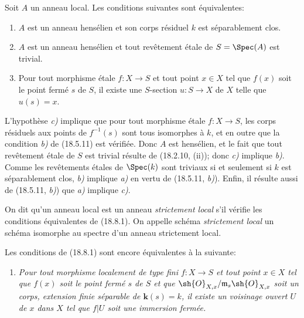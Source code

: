 \begin{proposition}[18.8.1]
\label{IV.18.8.1}
Soit $A$ un anneau local. Les conditions suivantes sont équivalentes:
\begin{enumerate}
  \item[\textup{a)}] $A$ est un anneau hensélien et son corps résiduel $k$ est séparablement clos.
  \item[\textup{b)}] $A$ est un anneau hensélien et tout revêtement étale de $S=\Spec(A)$ est trivial.
  \item[\textup{c)}] Pour tout morphisme étale $f:X\to S$ et tout point $x\in X$ tel que $f(x)$ soit le point fermé $s$ de $S$, il existe une $S$-section $u:S\to X$ de $X$ telle que $u(s)=x$.
\end{enumerate}
\end{proposition}

L'hypothèse \emph{c)} implique que pour tout morphisme étale $f:X\to S$, les corps résiduels aux points de $f^{-1}(s)$ sont tous isomorphes à $k$, et en outre que la condition \emph{b)} de (18.5.11) est vérifiée. Donc $A$ est hensélien, et le fait que tout revêtement étale de $S$ est trivial résulte de (18.2.10, (ii)); donc \emph{c)} implique \emph{b)}. Comme les revêtements étales de $\Spec(k)$ sont triviaux si et seulement si $k$ est séparablement clos, \emph{b)} implique \emph{a)} en vertu de (18.5.11, \emph{b)}). Enfin, il résulte aussi de (18.5.11, \emph{b)}) que \emph{a)} implique \emph{c)}.

\begin{definition}[18.8.2]
On dit qu'un anneau local est un anneau \emph{strictement local} s'il vérifie les conditions équivalentes de \textup{(18.8.1)}. On appelle schéma \emph{strictement local} un schéma isomorphe au spectre d'un anneau strictement local.
\end{definition}

\begin{remark}[18.8.3]
\label{IV.18.8.3}
Les conditions de (18.8.1) sont encore équivalentes à la suivante:
\begin{enumerate}
  \item[\textup{d)}] \itshape Pour tout morphisme localement de type fini $f:X\to S$ et tout point $x\in X$ tel que $f(x)$ soit le point fermé $s$ de $S$ et que $\sh{O}_{X,x}/\mathfrak m_s\sh{O}_{X,x}$ soit un corps, extension finie séparable de $\boldsymbol{k}(s)=k$, il existe un voisinage ouvert $U$ de $x$ dans $X$ tel que $f|U$ soit une immersion fermée.
\end{enumerate}
\end{remark}

